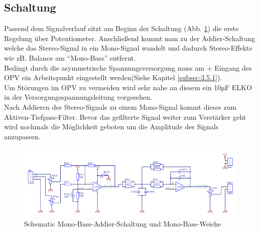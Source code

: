 \subsection{Schaltung}\label{subsec:4.2.3}
Passend dem Signalverlauf sitzt am Beginn der Schaltung (Abb. \ref{fig:4.2.3.1}) die erste Regelung über Potentiometer.
Anschließend kommt man zu der Addier-Schaltung welche das Stereo-Signal in ein Mono-Signal wandelt und dadurch Stereo-Effekte wie zB. Balance am \enquote{Mono-Bass} entfernt.\\
Bedingt durch die asymmetrische Spannungsversorgung muss am + Eingang des OPV ein Arbeitspunkt eingestellt werden(Siehe Kapitel \ref{subsec:3.5.1}).\\
Um Störungen im OPV zu vermeiden wird sehr nahe an diesem ein 10µF ELKO in der Versorgungsspannungsleitung vorgesehen.\\
Nach Addieren des Stereo-Signals zu einem Mono-Signal kommt dieses zum Aktiven-Tiefpass-Filter.
Bevor das gefilterte Signal weiter zum Verstärker geht wird nochmals die Möglichkeit geboten um die Amplitude des Signals anzupassen.
\begin{landscape}
	\vspace*{\fill}
	\begin{figure} [H]
		\centering
		\includegraphics[width=\linewidth,height=0.9\textheight,keepaspectratio]{img/Print3/3mTTWeicheruAddiererDiplSchematic.PNG}
		\caption{Schematic Mono-Bass-Addier-Schaltung und Mono-Bass-Weiche}
		\label {fig:4.2.3.1}
	\end{figure}
	\vfill
\end{landscape}
\raggedbottom


